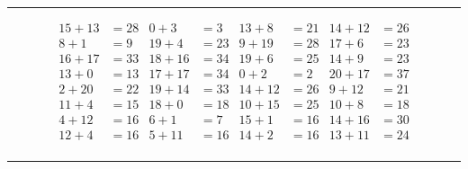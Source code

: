 \documentclass{article}
\begin{document}
\begin{sloppy}
\hrule
\begin{align*}
    {15} + {13} &= {28} & {0} + {3} &= {3} & {13} + {8} &= {21} & {14} + {12} &= {26} \\
    {8} + {1} &= {9} & {19} + {4} &= {23} & {9} + {19} &= {28} & {17} + {6} &= {23} \\
    {16} + {17} &= {33} & {18} + {16} &= {34} & {19} + {6} &= {25} & {14} + {9} &= {23} \\
    {13} + {0} &= {13} & {17} + {17} &= {34} & {0} + {2} &= {2} & {20} + {17} &= {37} \\
    {2} + {20} &= {22} & {19} + {14} &= {33} & {14} + {12} &= {26} & {9} + {12} &= {21} \\
    {11} + {4} &= {15} & {18} + {0} &= {18} & {10} + {15} &= {25} & {10} + {8} &= {18} \\
    {4} + {12} &= {16} & {6} + {1} &= {7} & {15} + {1} &= {16} & {14} + {16} &= {30} \\
    {12} + {4} &= {16} & {5} + {11} &= {16} & {14} + {2} &= {16} & {13} + {11} &= {24} \\
\end{align*}
\hrule
\end{sloppy}
\end{document}
